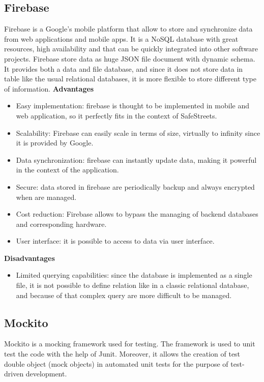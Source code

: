 \documentclass[../ITD.tex]{subfiles}
\begin{document}
    \subsection{Firebase}\label{subsec:firebase}
    Firebase is a Google's mobile platform that allow to store and synchronize data from web applications and mobile apps.
    It is a NoSQL database with great resources, high availability and that can be quickly integrated into other software projects.
    Firebase store data as huge JSON file document with dynamic schema.
    It provides both a data and file database, and since it does not store data in table like the usual relational databases, it is more flexible to store different type of information.
    \newline
    \textbf{Advantages}
    \begin{itemize}
        \item Easy implementation: firebase is thought to be implemented in mobile and web application, so it perfectly fits in the context of SafeStreets.
        \item Scalability: Firebase can easily scale in terms of size, virtually to infinity since it is provided by Google.
        \item Data synchronization: firebase can instantly update data, making it powerful in the context of the application.
        \item Secure: data stored in firebase are periodically backup and always encrypted when are managed.
        \item Cost reduction: Firebase allows to bypass the managing of backend databases and corresponding hardware.
        \item User interface: it is possible to access to data via user interface.
    \end{itemize}
    \textbf{Disadvantages}
    \begin{itemize}
        \item Limited querying capabilities: since the database is implemented as a single file, it is not possible to define relation like in a classic relational database, and because of that complex query are more difficult to be managed.
    \end{itemize}

    \subsection{Mockito}\label{subsec:mokito}
    Mockito is a mocking framework used for testing.
    The framework is used to unit test the code with the help of Junit.
    Moreover, it allows the creation of test double object (mock objects) in automated unit tests for the purpose of test-driven development.
\end{document}
